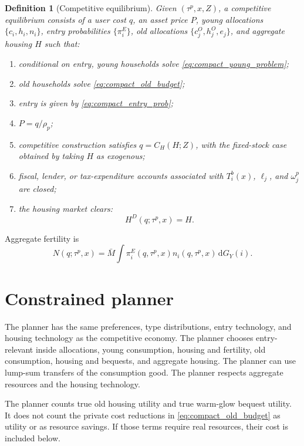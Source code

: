 \documentclass[11pt]{article}
\newtheorem{definition}{Definition}
\newcommand{\dd}{\mathrm d}
\newcommand{\1}{\mathbf 1}
\begin{document}
\begin{definition}[Competitive equilibrium]
Given $(\tau^p,x,Z)$, a competitive equilibrium consists of a user cost $q$, an asset price $P$, young allocations $\{c_i,h_i,n_i\}$, entry probabilities $\{\pi_i^E\}$, old allocations $\{c_j^O,h_j^O,e_j\}$, and aggregate housing $H$ such that:
\begin{enumerate}
\item conditional on entry, young households solve \eqref{eq:compact_young_problem};
\item old households solve \eqref{eq:compact_old_budget};
\item entry is given by \eqref{eq:compact_entry_prob};
\item $P=q/\rho_p$;
\item competitive construction satisfies $q=C_H(H;Z)$, with the fixed-stock case obtained by taking $H$ as exogenous;
\item fiscal, lender, or tax-expenditure accounts associated with $T_i^b(x)$, $\ell_j$, and $\omega_j^p$ are closed;
\item the housing market clears:
\begin{equation}
H^D(q;\tau^p,x)=H.
\label{eq:compact_clearing}
\end{equation}
\end{enumerate}
\end{definition}

Aggregate fertility is
\begin{equation}
N(q;\tau^p,x)
=
\bar M
\int
\pi_i^E(q,\tau^p,x)n_i(q,\tau^p,x)
\,\dd G_Y(i).
\label{eq:compact_aggregate_fertility}
\end{equation}

\section{Constrained planner}

The planner has the same preferences, type distributions, entry technology, and housing technology as the competitive economy. The planner chooses entry-relevant inside allocations, young consumption, housing and fertility, old consumption, housing and bequests, and aggregate housing. The planner can use lump-sum transfers of the consumption good. The planner respects aggregate resources and the housing technology.

The planner counts true old housing utility and true warm-glow bequest utility. It does not count the private cost reductions in \eqref{eq:compact_old_budget} as utility or as resource savings. If those terms require real resources, their cost is included below.
\end{document}
